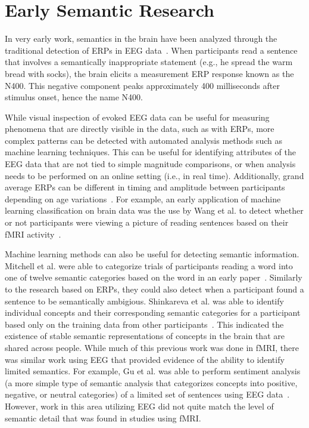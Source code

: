 \section{Early Semantic Research}

In very early work, semantics in the brain have been analyzed through the 
traditional detection of ERPs in EEG 
data~\cite{kutas1980reading,kuperberg2007neural}. When participants read a 
sentence that involves a semantically inappropriate statement (e.g., he spread 
the warm bread with socks), the brain elicits a measurement ERP response known 
as the N400. This negative component peaks approximately 400 milliseconds after 
stimulus onset, hence the name N400.

While visual inspection of evoked EEG data can be useful for measuring 
phenomena that are directly visible in the data, such as with ERPs, more 
complex patterns can be detected with automated analysis methods such as 
machine learning techniques. This can be useful for identifying attributes of 
the EEG data that are not tied to simple magnitude comparisons, or when 
analysis needs to be performed on an online setting (i.e., in real time).  
Additionally, grand average ERPs can be different in timing and amplitude 
between participants depending on age variations~\cite{cunningham2000speech}.  
For example, an early application of machine learning classification on brain 
data was the use by Wang et al. to detect whether or not participants were 
viewing a picture of reading sentences based on their fMRI 
activity~\cite{Wang2002}. 

Machine learning methods can also be useful for detecting semantic information.  
Mitchell et al. were able to categorize trials of participants reading a word 
into one of twelve semantic categories based on the word in an early 
paper~\cite{Mitchell2002}. Similarly to the research based on ERPs, they could 
also detect when a participant found a sentence to be semantically ambigious. 
Shinkareva et al. was able to identify individual concepts and their 
corresponding semantic categories for a participant based only on the training 
data from other participants~\cite{Shinkareva2008}. This indicated the 
existence of stable semantic representations of concepts in the brain that are 
shared across people. While much of this previous work was done in fMRI, there 
was similar work using EEG that provided evidence of the ability to identify 
limited semantics. For example, Gu et al. was able to perform sentiment 
analysis (a more simple type of semantic analysis that categorizes concepts 
into positive, negative, or neutral categories) of a limited set of sentences 
using EEG data~\cite{Gu2014}. However, work in this area utilizing EEG did not 
quite match the level of semantic detail that was found in studies using fMRI.
